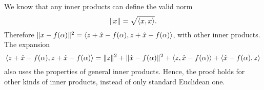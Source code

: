 \subsection{}
We know that any inner products can define the valid norm
\[\lVert x \rVert = \sqrt{\langle x, x \rangle}.\]
Therefore $\lVert x - f(\alpha) \rVert^2  = \langle z+\hat{x}-f(\alpha), z+\hat{x}-f(\alpha) \rangle$, with other inner products. The expansion
\[\langle z+\hat{x}-f(\alpha), z+\hat{x}-f(\alpha) \rangle = \lVert z \rVert^2 + \lVert \hat{x} - f(\alpha) \rVert^2 + \langle z, \hat{x}-f(\alpha) \rangle + \langle \hat{x}-f(\alpha), z \rangle\]
also uses the properties of general inner products. Hence, the proof holds for other kinds of inner products, instead of only standard Euclidean one.